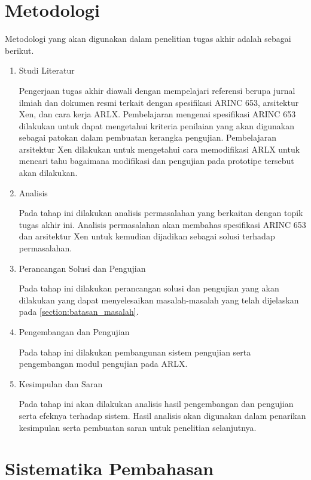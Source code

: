 \section{Metodologi}

Metodologi yang akan digunakan dalam penelitian tugas akhir adalah sebagai berikut.

\begin{enumerate}

    \item Studi Literatur

	Pengerjaan tugas akhir diawali dengan mempelajari referensi berupa jurnal ilmiah dan
	dokumen resmi terkait dengan spesifikasi ARINC 653, arsitektur Xen, dan cara kerja ARLX.
	Pembelajaran mengenai spesifikasi ARINC 653 dilakukan untuk dapat mengetahui kriteria
	penilaian yang akan digunakan sebagai patokan dalam pembuatan kerangka pengujian.
	Pembelajaran arsitektur Xen dilakukan untuk mengetahui cara memodifikasi ARLX untuk
	mencari tahu bagaimana modifikasi dan pengujian pada prototipe tersebut akan dilakukan.

    \item Analisis

	Pada tahap ini dilakukan analisis permasalahan yang berkaitan dengan topik tugas akhir
	ini.  Analisis permasalahan akan membahas spesifikasi ARINC 653 dan arsitektur Xen untuk
	kemudian dijadikan sebagai solusi terhadap permasalahan.

    \item Perancangan Solusi dan Pengujian

	Pada tahap ini dilakukan perancangan solusi dan pengujian yang akan dilakukan yang dapat
	menyelesaikan masalah\hyp{}masalah yang telah dijelaskan pada
	\autoref{section:batasan_masalah}.

    \item Pengembangan dan Pengujian

	Pada tahap ini dilakukan pembangunan sistem pengujian serta pengembangan modul
	pengujian pada ARLX.

    \item Kesimpulan dan Saran

	Pada tahap ini akan dilakukan analisis hasil pengembangan dan pengujian serta efeknya
	terhadap sistem. Hasil analisis akan digunakan dalam penarikan kesimpulan serta
	pembuatan saran untuk penelitian selanjutnya.

\end{enumerate}

\section{Sistematika Pembahasan}

